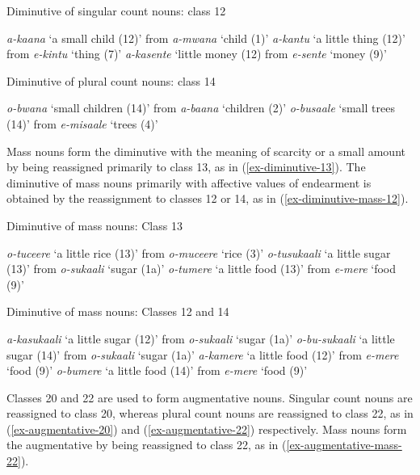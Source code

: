 \ea Diminutive of singular count nouns: class 12 \label{ex-diminutive-12}
\begin{xlist}
\ex \textit{a-kaana} ‘a small child (12)’  from \textit{a-mwana} ‘child (1)’
\ex \textit{a-kantu} ‘a little thing (12)’ from \textit{e-kintu} ‘thing (7)’
\ex \textit{a-kasente} ‘little money (12) from \textit{e-sente} ‘money (9)’
\end{xlist}	
\z

\ea Diminutive of plural count nouns: class 14 \label{ex-diminutive-14}
\begin{xlist}
\ex \textit{o-bwana} ‘small children (14)’ from \textit{a-baana} ‘children (2)’
\ex \textit{o-busaale} ‘small trees (14)’  from \textit{e-misaale} ‘trees (4)’
\end{xlist}	
\z

\hspace*{-2pt}Mass nouns form the diminutive with the meaning of scarcity or a small amount by being reassigned primarily to class 13, as in (\ref{ex-diminutive-13}).
The diminutive of mass nouns primarily with affective values of endearment is obtained by the reassignment to classes 12 or 14, as in  (\ref{ex-diminutive-mass-12}). 

\newpage
\ea Diminutive of mass nouns: Class 13 \label{ex-diminutive-13}
\begin{xlist}	
	\ex \textit{o-tuceere}  ‘a little rice (13)’ from \textit{o-muceere} ‘rice (3)’
	\ex \textit{o-tusukaali} ‘a little sugar (13)’ from \textit{o-sukaali} ‘sugar (1a)’
	\ex \textit{o-tumere} ‘a little food (13)’ from \textit{e-mere} ‘food (9)’
\end{xlist}	
\z

\ea Diminutive of mass nouns: Classes 12 and 14 \label{ex-diminutive-mass-12}
\begin{xlist}	
	\ex \textit{a-kasukaali} ‘a little sugar (12)’ from \textit{o-sukaali} ‘sugar (1a)’
	\ex \textit{o-bu-sukaali} ‘a little sugar (14)’ from \textit{o-sukaali} ‘sugar (1a)’ 
	\ex \textit{a-kamere} ‘a little food (12)’ from \textit{e-mere} ‘food (9)’
	\ex \textit{o-bumere} ‘a little food (14)’ from \textit{e-mere} ‘food (9)’
\end{xlist}	
\z

Classes 20 and 22 are used to form augmentative nouns. 
Singular count nouns are reassigned to class 20, whereas plural count nouns are reassigned to class 22, as in (\ref{ex-augmentative-20}) and (\ref{ex-augmentative-22}) respectively. 
Mass nouns form the augmentative by being reassigned to class 22, as in (\ref{ex-augmentative-mass-22}).

